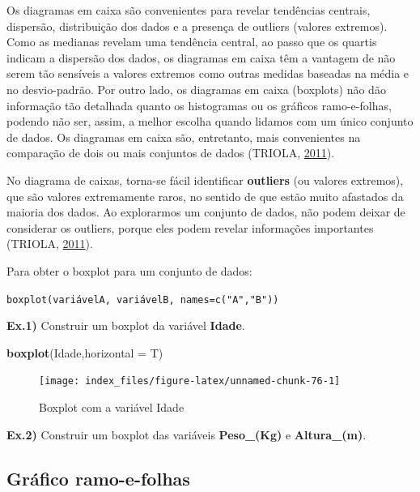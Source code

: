 \documentclass[12pt,portuguese,oneside]{book}
\newenvironment{Shaded}{\begin{snugshade}}{\end{snugshade}}
\newcommand{\KeywordTok}[1]{\textcolor[rgb]{0.13,0.29,0.53}{\textbf{#1}}}
\newcommand{\DataTypeTok}[1]{\textcolor[rgb]{0.13,0.29,0.53}{#1}}
\newcommand{\NormalTok}[1]{#1}
\begin{document}
Os diagramas em caixa são convenientes para revelar tendências centrais,
dispersão, distribuição dos dados e a presença de outliers (valores
extremos). Como as medianas revelam uma tendência central, ao passo que
os quartis indicam a dispersão dos dados, os diagramas em caixa têm a
vantagem de não serem tão sensíveis a valores extremos como outras
medidas baseadas na média e no desvio-padrão. Por outro lado, os
diagramas em caixa (boxplots) não dão informação tão detalhada quanto os
histogramas ou os gráficos ramo-e-folhas, podendo não ser, assim, a
melhor escolha quando lidamos com um único conjunto de dados. Os
diagramas em caixa são, entretanto, mais convenientes na comparação de
dois ou mais conjuntos de dados (TRIOLA,
\protect\hyperlink{ref-triola1999}{2011}).

No diagrama de caixas, torna-se fácil identificar \textbf{outliers} (ou
valores extremos), que são valores extremamente raros, no sentido de que
estão muito afastados da maioria dos dados. Ao explorarmos um conjunto
de dados, não podem deixar de considerar os outliers, porque eles podem
revelar informações importantes (TRIOLA,
\protect\hyperlink{ref-triola1999}{2011}).

Para obter o boxplot para um conjunto de dados:

\texttt{boxplot(variávelA,\ variávelB,\ names=c("A","B"))}

\textbf{Ex.1)} Construir um boxplot da variável \textbf{Idade}.

\begin{Shaded}
\begin{Highlighting}[]
\KeywordTok{boxplot}\NormalTok{(Idade,}\DataTypeTok{horizontal =}\NormalTok{ T)}
\end{Highlighting}
\end{Shaded}

\begin{figure}[H]

{\centering \texttt{[image: index\_files/figure-latex/unnamed-chunk-76-1]} 

}

\caption{Boxplot com a variável Idade}\label{fig:unnamed-chunk-76}
\end{figure}

\textbf{Ex.2)} Construir um boxplot das variáveis \textbf{Peso\_(Kg)} e
\textbf{Altura\_(m)}.

\subsection{Gráfico ramo-e-folhas}\label{grafico-ramo-e-folhas}
\end{document}
